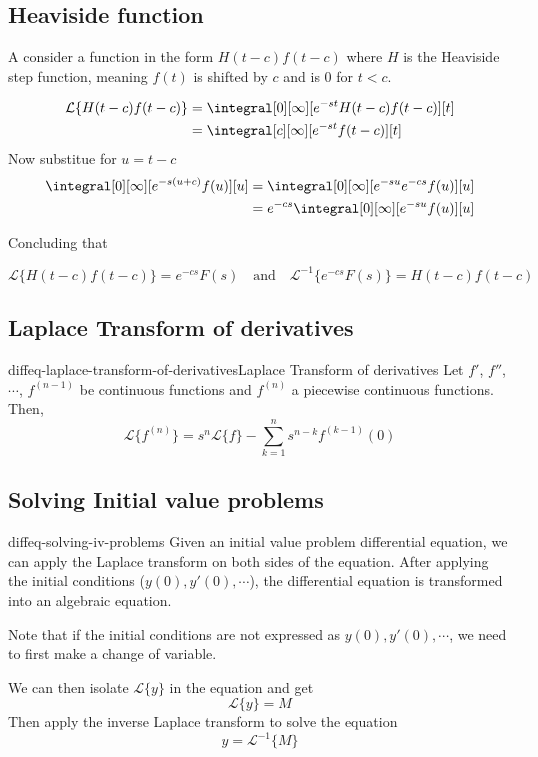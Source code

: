 \documentclass[preview]{standalone}
\begin{document}
\subsection{Heaviside function}


A consider a function in the form \(H(t-c)f(t-c)\) where \(H\) is the
Heaviside step function, meaning \(f(t)\) is shifted by \(c\) and is \(0\) for \(t < c\).

\begin{align*}
    \mathcal{L}\{H(t-c)f(t-c)\} &=
    \integral[0][\infty][e^{-st}H(t-c)f(t-c)][t] \\
    &= \integral[c][\infty][e^{-st}f(t-c)][t]
\end{align*}
Now substitue for \(u=t-c\)
\begin{align*}
    \integral[0][\infty][e^{-s(u+c)}f(u)][u]
    &= \integral[0][\infty][e^{-su}e^{-cs}f(u)][u] \\
    &= e^{-cs} \integral[0][\infty][e^{-su}f(u)][u]
\end{align*}

Concluding that

\[
    \mathcal{L}\{H(t-c)f(t-c)\} =
    e^{-cs}F(s)
    \quad
    \text{and}
    \quad
    {\mathcal{L}}^{-1}\{e^{-cs}F(s)\} =
    H(t-c)f(t-c)
\]

\subsection{Laplace Transform of derivatives}

\begin{snippettheorem}{diffeq-laplace-transform-of-derivatives}{Laplace Transform of derivatives}{
    Let \(f'\), \(f''\), \(\cdots\), \(f^{(n-1)}\) be continuous functions
    and \(f^{(n)}\) a piecewise continuous functions. Then,
    \[
        \mathcal{L}\{f^{(n)}\} =
        s^n \mathcal{L}\{f\} -
        \sum_{k=1}^n s^{n-k}f^{(k-1)}(0)
    \]
}
\end{snippettheorem}

\subsection{Solving Initial value problems}

\begin{snippet}{diffeq-solving-iv-problems}
Given an initial value problem differential equation, we can apply the Laplace
transform on both sides of the equation. After applying the initial conditions
(\(y(0), y'(0), \cdots\)), the differential equation is transformed into an algebraic equation.

Note that if the initial conditions are not expressed as  \(y(0), y'(0), \cdots\),
we need to first make a change of variable.

We can then isolate \(\mathcal{L}\{y\}\) in the equation and get
\[
    \mathcal{L}\{y\} = M
\]
Then apply the inverse Laplace transform to solve the equation
\[
    y={\mathcal{L}}^{-1}\{M\}
\]
\end{snippet}

\end{document}
